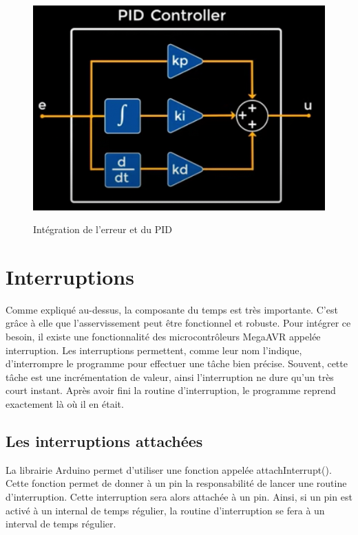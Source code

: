 \documentclass[
	a4paper,									%
	11pt,										%
	twoside,									%
	openright,									%
	notitlepage,									%
	parskip=half,								%
]{scrreprt}										%
\begin{document}
	\begin{figure}[h!]
		\centering
		\includegraphics[scale=.3]{img/PID.png}
		\label{PIDfig}
		\caption{Intégration de l'erreur et du PID}
	\end{figure}



\chapter{Interruptions}

Comme expliqué au-dessus, la composante du temps est très importante. C'est grâce à elle que l'asservissement peut être fonctionnel et robuste. Pour intégrer ce besoin, il existe une fonctionnalité 
des microcontrôleurs MegaAVR appelée interruption. Les interruptions permettent, comme leur nom l'indique, d'interrompre le programme pour effectuer une tâche bien précise. Souvent, cette tâche est une incrémentation de valeur, ainsi 
l'interruption ne dure qu'un très court instant. Après avoir fini la routine d'interruption, le programme reprend exactement là où il en était. \par

\section{Les interruptions attachées}

La librairie Arduino permet d'utiliser une fonction appelée attachInterrupt(). Cette fonction permet de donner à un pin la responsabilité de lancer une routine d'interruption. Cette interruption sera alors attachée à un pin. Ainsi, si un pin est activé 
à un internal de temps régulier, la routine d'interruption se fera à un interval de temps régulier. \par
\end{document}
